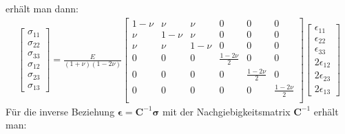 \documentclass[letterpaper,10pt,german]{jupyterBook}
\begin{document}
\sphinxAtStartPar
erhält man dann:
\begin{equation}\label{equation:chapters/chapter1/elasticity:generalHook3}
\begin{split}\begin{bmatrix} 
\sigma_{11} \\
\sigma_{22} \\
\sigma_{33} \\
\sigma_{12} \\
\sigma_{23} \\
\sigma_{13} 
\end{bmatrix} = \frac{E}{(1+\nu)(1-2\nu)}\begin{bmatrix}
1-\nu & \nu & \nu & 0 & 0 & 0 \\
\nu & 1-\nu & \nu & 0 & 0 & 0 \\
\nu & \nu & 1-\nu & 0 & 0 & 0 \\
0 & 0 & 0 & \frac{1-2\nu}{2} & 0 & 0 \\
0 & 0 & 0 & 0 & \frac{1-2\nu}{2} & 0 \\
0 & 0 & 0 & 0 & 0 & \frac{1-2\nu}{2} \\ 
\end{bmatrix} \begin{bmatrix} \epsilon_{11} \\ \epsilon_{22} \\ \epsilon_{33} \\ 2\epsilon_{12} \\ 2\epsilon_{23} \\ 2\epsilon_{13} \end{bmatrix}\end{split}
\end{equation}
\sphinxAtStartPar
Für die inverse Beziehung \(\bm{\epsilon} = \bm{C}^{-1} \bm{\sigma}\) mit der Nachgiebigkeitsmatrix \(\bm{C}^{-1}\) erhält man:
\end{document}
